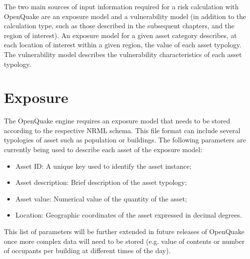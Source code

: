 The two main sources of input information required for a risk calculation with OpenQuake are an exposure model and a vulnerability model (in addition to the calculation type, such as those described in the subsequent chapters, and the region of interest). An exposure model for a given asset category describes, at each location of interest within a given region, the value of each asset typology. The vulnerability model describes the vulnerability characteristics of each asset typology.
\section{Exposure}
The OpenQuake engine requires an exposure model that needs to be stored according to the respective NRML schema. This file format can include several typologies of asset such as population or buildings. The following parameters are currently being used to describe each asset of the exposure model: 

\begin{itemize}
\item Asset ID: A unique key used to identify the asset instance;
\item Asset description: Brief description of the asset typology;
\item Asset value: Numerical value of the quantity of the asset;
\item Location: Geographic coordinates of the asset expressed in decimal degrees.
\end{itemize}

This list of parameters will be further extended in future releases of OpenQuake once more complex data will need to be stored (e.g. value of contents or number of occupants per building at different times of the day).  

